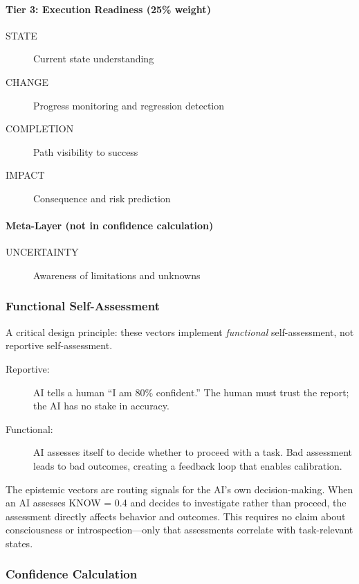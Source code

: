 \paragraph{Tier 3: Execution Readiness (25\% weight)}
\begin{description}
    \item[STATE] Current state understanding
    \item[CHANGE] Progress monitoring and regression detection
    \item[COMPLETION] Path visibility to success
    \item[IMPACT] Consequence and risk prediction
\end{description}

\paragraph{Meta-Layer (not in confidence calculation)}
\begin{description}
    \item[UNCERTAINTY] Awareness of limitations and unknowns
\end{description}

\subsubsection{Functional Self-Assessment}

A critical design principle: these vectors implement \emph{functional} self-assessment, not reportive self-assessment.

\begin{description}
    \item[Reportive:] AI tells a human ``I am 80\% confident.'' The human must trust the report; the AI has no stake in accuracy.
    \item[Functional:] AI assesses itself to decide whether to proceed with a task. Bad assessment leads to bad outcomes, creating a feedback loop that enables calibration.
\end{description}

The epistemic vectors are routing signals for the AI's own decision-making. When an AI assesses KNOW = 0.4 and decides to investigate rather than proceed, the assessment directly affects behavior and outcomes. This requires no claim about consciousness or introspection---only that assessments correlate with task-relevant states.

\subsubsection{Confidence Calculation}

